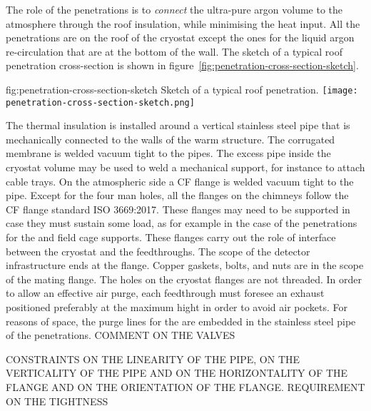 The role of the penetrations is to \emph{connect} the ultra-pure argon volume to the atmosphere through the roof insulation, while minimising the heat input.
All the penetrations are on the roof of the cryostat except the ones for the liquid argon re-circulation that are at the bottom of the  wall.
The sketch of a typical roof penetration cross-section is shown in figure~\ref{fig:penetration-cross-section-sketch}.
\begin{dunefigure}{fig:penetration-cross-section-sketch}
{Sketch of a typical roof penetration.}
\texttt{[image: penetration-cross-section-sketch.png]}
\end{dunefigure}
The thermal insulation is installed around a vertical stainless steel pipe that is mechanically connected to the walls of the warm structure.
The corrugated membrane is welded vacuum tight to the pipes.
The excess pipe inside the cryostat volume may be used to weld a mechanical support, for instance to attach cable trays.
On the atmospheric side a  CF flange is welded vacuum tight to the pipe. 
Except for the four man holes, all the flanges on the chimneys follow the  CF flange standard ISO 3669:2017.
These flanges may need to be supported in case they must sustain some load, as for example in the case of the penetrations for the  and field cage supports.
These flanges carry out the role of interface between the cryostat and the feedthroughs.
The scope of the detector infrastructure ends at the flange.
Copper gaskets, bolts, and nuts are in the scope of the mating flange.
The holes on the cryostat flanges are not threaded.
In order to allow an effective air purge, each feedthrough must foresee an exhaust positioned preferably at the maximum hight in order to avoid air pockets.
For reasons of space, the purge lines for the  are embedded in the stainless steel pipe of the penetrations.
COMMENT ON THE VALVES

CONSTRAINTS ON THE LINEARITY OF THE PIPE, ON THE VERTICALITY OF THE PIPE AND ON THE HORIZONTALITY OF THE FLANGE AND ON THE ORIENTATION OF THE FLANGE.
REQUIREMENT ON THE TIGHTNESS

